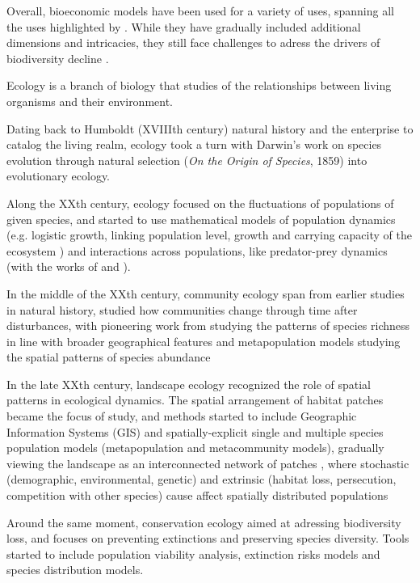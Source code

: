 Overall, bioeconomic models have been used for a variety of uses, spanning all the uses highlighted by \cite{varenne_epistemologie_2014} . While they have gradually included additional dimensions and intricacies, they still face challenges to adress the drivers of biodiversity decline \citep{Drechsler20200}.

\clearpage
\begin{tcolorbox}[breakable, 
				  colback=verylightgray, 
				  colframe=gray!75!black, 
				  title= {Box 3 - A brief overview of ecological modeling for biodiversity},
				  fontupper=\small]
\par %
\justifying %
Ecology is a branch of biology that studies of the relationships between living organisms and their environment.

Dating back to Humboldt (XVIIIth century) natural history and the enterprise to catalog the living realm, ecology took a turn with Darwin's work on  species evolution through natural selection (\textit{On the Origin of Species}, 1859) into evolutionary ecology. 

Along the XXth century, ecology focused on the fluctuations of populations of given species, and started to use mathematical models of population dynamics (e.g. logistic growth, linking population level, growth and carrying capacity of the ecosystem \cite{verhulst_1838}) and interactions across populations, like predator-prey dynamics (with the works of \cite{alfred_jlotka_elements_1925} and \cite{volterra_fluctuations_1926}). 

In the middle of the XXth century, community ecology span from earlier studies in natural history, studied how communities change through time after disturbances, with pioneering work from \cite{macarthur_theory_1967} studying the patterns of species richness in line with broader geographical features and metapopulation models studying the spatial patterns of species abundance \citep{levins_demographic_1969, roughgarden_population_1974}

In the late XXth century, landscape ecology recognized the role of spatial patterns in ecological dynamics. The spatial arrangement of habitat patches became the focus of study, and methods started to include Geographic Information Systems (GIS) and spatially-explicit single and multiple species population models (metapopulation  and metacommunity models), gradually viewing the landscape as an interconnected network of patches \citep{hanski_metapopulation_1998, urban_landscape_2001}, where stochastic (demographic, environmental, genetic) and extrinsic (habitat loss, persecution, competition with other species) cause affect spatially distributed populations \citep{hanski_metapopulation_1998}

Around the same moment, conservation ecology \citep{soule_conservation_1986} aimed at adressing biodiversity loss, and focuses on preventing extinctions and preserving species diversity. Tools started to include population viability analysis, extinction risks models and species distribution models. 
\end{tcolorbox}


